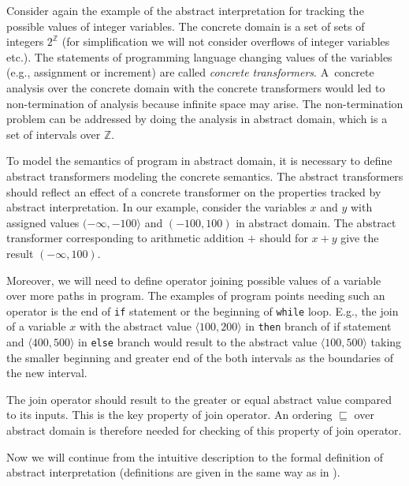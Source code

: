 \documentclass[a4paper, 12pt]{article}
\newcommand{\interval}[2]{\langle #1,#2 \rangle}
\newcommand{\aord}[0]{\sqsubseteq}
\begin{document}
Consider again the example of the abstract interpretation for tracking
the possible values of integer variables.
The concrete domain is a set of sets of integers $2^\mathbb{Z}$ (for simplification
we will not consider overflows of integer variables etc.).
The statements of programming language changing values of the variables
(e.g., assignment or increment) are called \emph{concrete transformers}.
A~concrete analysis over the concrete domain with the concrete transformers
would led to non-termination of analysis because infinite space may arise.
The non-termination problem can be addressed by doing the analysis in abstract domain,
which is a set of intervals over $\mathbb{Z}$.

To model the semantics of program in abstract domain, it is necessary to define
abstract transformers modeling the concrete semantics.
The abstract transformers should reflect an effect of a concrete transformer
on the properties tracked by abstract interpretation.
In our example, consider the variables $x$ and $y$ with assigned values $(-\infty,-100\rangle$
and $(-100, 100)$ in abstract domain.
The abstract transformer corresponding to arithmetic addition $+$
should for $x+y$ give the result $(-\infty,100)$.

Moreover, we will need to define operator joining possible values
of a variable over more paths in program.
The examples of program points needing such an operator is
the end of \texttt{if} statement or the beginning of \texttt{while} loop.
E.g., the join of a variable $x$
with the abstract value $\interval{100}{200}$ in \texttt{then} branch
of if statement and $\interval{400}{500}$ in \texttt{else} branch
would result to the abstract value $\interval{100}{500}$ taking the smaller beginning
and greater end of the both intervals as the boundaries of the new interval.

The join operator should result to the greater or
equal abstract value compared to its inputs.
This is the key property of join operator.
An ordering $\aord$ over abstract domain is therefore needed
for checking of this property of join operator.

Now we will continue from the intuitive description to
the formal definition of abstract interpretation (definitions
are given in the same way as in \cite{popl77}).
\end{document}
